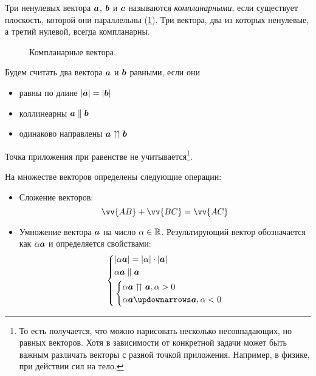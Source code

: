 \documentclass[a4paper,12pt]{article}
\begin{document}
  \begin{definition}[Компланарность]
    Три ненулевых вектора $\boldsymbol a$, $\boldsymbol b$ и $\boldsymbol c$ называются \emph{компланарными}, если существует плоскость, которой они параллельны (\ref{fig:coplanarity}).
    Три вектора, два из которых ненулевые, а третий нулевой, всегда компланарны.
  \end{definition}
  
  \begin{figure}[h]
    \centering
    
    
    \caption{Компланарные вектора.}
    \label{fig:coplanarity}
  \end{figure}
  
  \begin{definition}
    Будем считать два вектора $\boldsymbol a$ и $\boldsymbol b$ равными, если они
    \begin{itemize}
      \item равны по длине $|\boldsymbol a| = |\boldsymbol b|$
      \item коллинеарны $\boldsymbol a \parallel \boldsymbol b$
      \item одинаково направлены $\boldsymbol a \upuparrows \boldsymbol b$
    \end{itemize}
    Точка приложения при равенстве не учитывается\footnote{То есть получается, что можно нарисовать несколько несовпадающих, но равных векторов. Хотя в зависимости от конкретной задачи может быть важным различать векторы с разной точкой приложения. Например, в физике, при действии сил на тело.}.
  \end{definition}
  
  На множестве векторов определены следующие операции:
  \begin{itemize}
    \item Сложение векторов:
      \[
        \vv{AB} + \vv{BC} = \vv{AC}
      \]
    \item Умножение вектора $\boldsymbol a$ на число $\alpha \in \operatorname{\mathbb R}$.
      Результирующий вектор обозначается как $\alpha \boldsymbol a$ и определяется свойствами:
      \[
        \left\{
          \begin{aligned}
            &|\alpha \bds a| = |\alpha| \cdot |\bds a|\\
            &\alpha \bds a \parallel \bds a\\
            &\left\{
               \begin{aligned}
                 &\alpha \bds a \upuparrows \bds a, \alpha > 0\\
                 &\alpha \bds a \updownarrows \bds a, \alpha < 0
               \end{aligned}
             \right.
          \end{aligned}
        \right.
      \]
  \end{itemize}
  
\end{document}
